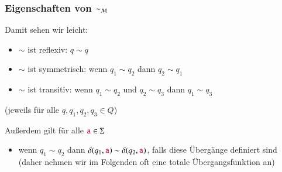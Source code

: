 \documentclass[onlymath]{beamer}
\begin{document}
\begin{frame}\frametitle{Eigenschaften von $\sim_{\mathcal{M}}$}

%
\smallskip\pause

Damit sehen wir leicht:
\begin{itemize}
\item $\sim$ ist \alert{reflexiv}: $q\sim q$
\item $\sim$ ist \alert{symmetrisch}: wenn $q_1\sim q_2$ dann $q_2\sim q_1$
\item $\sim$ ist \alert{transitiv}: wenn $q_1\sim q_2$ und $q_2\sim q_3$ dann $q_1\sim q_3$
\end{itemize}
(jeweils für alle $q,q_1,q_2,q_3\in Q$)
\medskip

%
\smallskip\pause

Außerdem gilt für alle $\mathtt{\textcolor{purple}{a}}\in\Sigma$
\begin{itemize}
\item wenn $q_1\sim q_2$ dann $\delta(q_1,\mathtt{\textcolor{purple}{a}})\sim\delta(q_2,\mathtt{\textcolor{purple}{a}})$,
falls diese Übergänge definiert sind {\tiny (daher nehmen wir im Folgenden oft eine totale Übergangsfunktion an)}
\end{itemize}
\smallskip

\smallskip

\end{frame}

\newcommand{\simquot}[1]{#1/_{\!\!{\sim}}}
\end{document}

